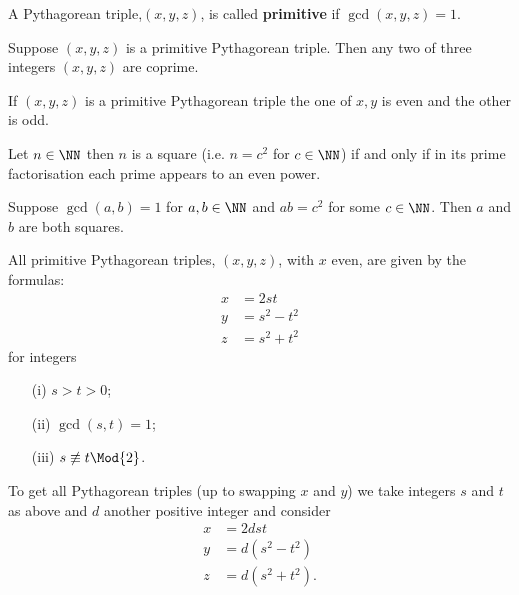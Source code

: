 \documentclass[12pt, a4paper]{article}
\begin{document}
\begin{definition}
    A Pythagorean triple,\((x,y,z)\), is called \textbf{primitive} if \(\gcd(x,y,z) =1\).
\end{definition}

\begin{lemma}
    Suppose \((x,y,z)\) is a primitive Pythagorean triple. Then any two of three integers \((x,y,z)\) are coprime.
\end{lemma}

\begin{lemma}
    If \((x,y,z)\) is a primitive Pythagorean triple the one of \(x,y\) is even and the other is odd.
\end{lemma}

\begin{theorem}
    Let \(n \in \NN\) then \(n\) is a square (i.e. \(n=c^2\) for \(c \in \NN\)) if and only if in its prime factorisation each prime appears to an even power.
\end{theorem}

\begin{lemma}
    Suppose \(\gcd(a,b)=1\) for \(a,b \in \NN\) and \(ab=c^2\) for some \(c\in \NN\). Then \(a\) and \(b\) are both squares.
\end{lemma}

\begin{mdthm}
    All primitive Pythagorean triples, \((x,y,z)\), with \(x\) even, are given by the formulas:
    \[\begin{aligned}
        x&=2st \\
        y&=s^2-t^2 \\
        z&=s^2+t^2
    \end{aligned}\]
    for integers
    \begin{enumerate}
        \item[(i)] \(s>t>0\);
        \item[(ii)] \(\gcd(s,t)=1\);
        \item[(iii)] \(s \not\equiv t \Mod{2}\).
    \end{enumerate}
    To get all Pythagorean triples (up to swapping \(x\) and \(y\)) we take integers \(s\) and \(t\) as above and \(d\) another positive integer and consider 
    \[\begin{aligned}
        x&=2dst \\
        y&=d(s^2-t^2) \\
        z&= d(s^2+t^2).
    \end{aligned}\]
\end{mdthm}
\end{document}
